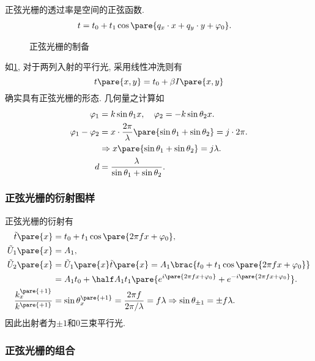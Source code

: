 \documentclass{ctexart}
\begin{document}
正弦光栅的透过率是空间的正弦函数.
\begin{align*}
    t &= t_0 + t_1 \cos\pare{q_x\cdot x + q_y \cdot y + \varphi_0}.
\end{align*}
\begin{figure}[ht]
    \centering
    \caption{正弦光栅的制备}
    \label{fig:正弦光栅的制备}
\end{figure}
如\cref{fig:正弦光栅的制备}, 对于两列入射的平行光, 采用线性冲洗则有
\[ t\pare{x,y} = t_0 + \beta I\pare{x,y} \]
确实具有正弦光栅的形态. 几何量之计算如
\begin{align*}
    \varphi_1 &= k\sin\theta_1 x, \quad \varphi_2 = -k\sin\theta_2 x. \\
    \varphi_1 - \varphi_2 &= x\cdot \frac{2\pi}{\lambda} \pare{\sin\theta_1 + \sin\theta_2} = j\cdot 2\pi. \\
    &\Rightarrow x\pare{\sin\theta_1 + \sin\theta_2} = j\lambda. \\
    d &= \frac{\lambda}{\sin\theta_1 + \sin\theta_2}.
\end{align*}


\subsubsection{正弦光栅的衍射图样} %
\label{ssub:正弦光栅的衍射图样}

正弦光栅的衍射有
\begin{align*}
    \tilde{t}\pare{x} &= t_0 + t_1 \cos\pare{2\pi fx + \varphi_0}, \\
    \tilde{U}_1\pare{x} &= A_1, \\
    \tilde{U}_2\pare{x} &= \tilde{U}_1\pare{x} \tilde{t}\pare{x} = A_1 \brac{t_0 + t_1\cos\pare{2\pi f x + \varphi_0}} \\
    &= A_1 t_0 + \half A_1 t_1 \pare{e^{i\pare{2\pi fx + \varphi_0}} + e^{-i\pare{2\pi fx + \varphi_0}}}. \\
    \frac{k_x^{\pare{+1}}}{k^{\pare{+1}}} &= \sin \theta_x^{\pare{+1}} = \frac{2\pi f}{2\pi/\lambda} = f\lambda \Rightarrow \sin\theta_{\pm 1} = \pm f\lambda.
\end{align*}
因此出射者为$\pm 1$和$0$三束平行光.


\subsubsection{正弦光栅的组合} %
\label{ssub:正弦光栅的组合}
\end{document}
